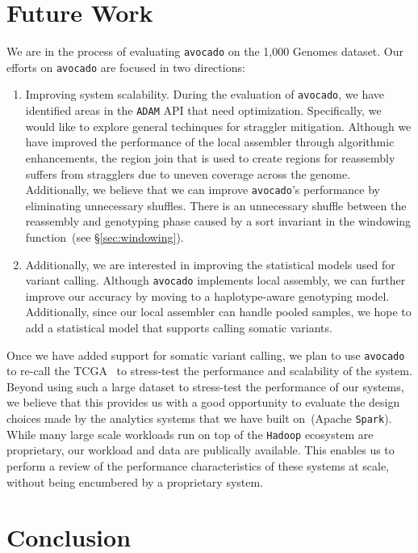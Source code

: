 \documentclass[masters]{ucbthesis}
\begin{document}
\section{Future Work}
\label{sec:future-work}

We are in the process of evaluating \texttt{avocado} on the 1,000 Genomes dataset.
Our efforts on \texttt{avocado} are focused in two directions:

\begin{enumerate}
\item Improving system scalability. During the evaluation of \texttt{avocado}, we have
identified areas in the \texttt{ADAM} API that need optimization. Specifically, we would
like to explore general techinques for straggler mitigation. Although we have improved
the performance of the local assembler through algorithmic enhancements, the region join
that is used to create regions for reassembly suffers from stragglers due to uneven
coverage across the genome. Additionally, we believe that we can improve \texttt{avocado}'s
performance by eliminating unnecessary shuffles. There is an unnecessary shuffle between
the reassembly and genotyping phase caused by a sort invariant in the windowing
function~(see \S\ref{sec:windowing}).
\item Additionally, we are interested in improving the statistical models used for variant
calling. Although \texttt{avocado} implements local assembly, we can further improve our
accuracy by moving to a haplotype-aware genotyping model. Additionally, since our local
assembler can handle pooled samples, we hope to add a statistical model that supports
calling somatic variants.
\end{enumerate}

Once we have added support for somatic variant calling, we plan to use \texttt{avocado} to
re-call the TCGA~\cite{weinstein13} to stress-test the performance and scalability of the
system. Beyond using such a large dataset to stress-test the performance of our systems,
we believe that this provides us with a good opportunity to evaluate the design choices made
by the analytics systems that we have built on~(Apache \texttt{Spark}). While many large
scale workloads run on top of the \texttt{Hadoop} ecosystem are proprietary, our workload
and data are publically available. This enables us to perform a review of the performance
characteristics of these systems at scale, without being encumbered by a proprietary system.


\section{Conclusion}
\label{sec:conclusion}
\end{document}

